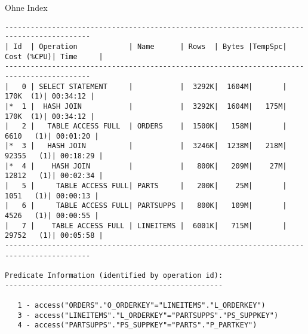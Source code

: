 \documentclass[10pt]{article}
\begin{document}
Ohne Index
\begin{lstlisting}[style=queryexecutionplan]
------------------------------------------------------------------------------------------
| Id  | Operation            | Name      | Rows  | Bytes |TempSpc| Cost (%CPU)| Time     |
------------------------------------------------------------------------------------------
|   0 | SELECT STATEMENT     |           |  3292K|  1604M|       |   170K  (1)| 00:34:12 |
|*  1 |  HASH JOIN           |           |  3292K|  1604M|   175M|   170K  (1)| 00:34:12 |
|   2 |   TABLE ACCESS FULL  | ORDERS    |  1500K|   158M|       |  6610   (1)| 00:01:20 |
|*  3 |   HASH JOIN          |           |  3246K|  1238M|   218M| 92355   (1)| 00:18:29 |
|*  4 |    HASH JOIN         |           |   800K|   209M|    27M| 12812   (1)| 00:02:34 |
|   5 |     TABLE ACCESS FULL| PARTS     |   200K|    25M|       |  1051   (1)| 00:00:13 |
|   6 |     TABLE ACCESS FULL| PARTSUPPS |   800K|   109M|       |  4526   (1)| 00:00:55 |
|   7 |    TABLE ACCESS FULL | LINEITEMS |  6001K|   715M|       | 29752   (1)| 00:05:58 |
------------------------------------------------------------------------------------------
 
Predicate Information (identified by operation id):
---------------------------------------------------
 
   1 - access("ORDERS"."O_ORDERKEY"="LINEITEMS"."L_ORDERKEY")
   3 - access("LINEITEMS"."L_ORDERKEY"="PARTSUPPS"."PS_SUPPKEY")
   4 - access("PARTSUPPS"."PS_SUPPKEY"="PARTS"."P_PARTKEY")
\end{lstlisting}
\end{document}
